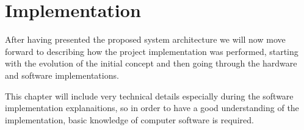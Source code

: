 \chapter{Implementation} \label{chap:impl}

After having presented the proposed system architecture we will now move forward to describing how the project implementation was performed, starting with the evolution of the initial concept and then going through the hardware and software implementations.

This chapter will include very technical details especially during the software implementation explanaitions, so in order to have a good understanding of the implementation, basic knowledge of computer software is required.










